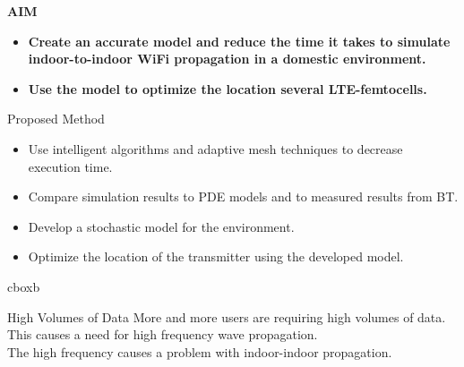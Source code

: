 \documentclass[final]{beamer}
\theoremstyle{plain}
\theoremstyle{definition}
\theoremstyle{remark}
\newlength{\twocolwid}
\begin{document}
\begin{frame}[t]
\begin{columns}[t]
\begin{column}{\twocolwid}
\begin{mdframed}[backgroundcolor=white, userdefinedwidth=0.999999\linewidth]
    \end{mdframed}
    \vspace{1.5cm}
\begin{mdframed}[backgroundcolor=white]
\begin{alertblock}{\textbf{AIM}}

\begin{itemize}

\item \textbf{Create an accurate model and reduce the time it takes to simulate indoor-to-indoor WiFi propagation in a domestic environment.}
\item \textbf{Use the model to optimize the location several LTE-femtocells.
}
\end{itemize}
\end{alertblock}
\vspace{-1cm}
\end{mdframed}
\vspace{2cm}



\begin{block}{Proposed Method}
\vspace{-2cm}
\begin{itemize}
\item Use intelligent algorithms and adaptive mesh techniques to decrease execution time.
\item Compare simulation results to PDE models and to measured results from BT.
\item Develop a stochastic model for the environment.
\item Optimize the location of the transmitter using the developed model.
\end{itemize}
\end{block}
 
 \vspace{-2cm}
 \hspace{0.5in}
 \begin{beamercolorbox}[wd=14in,colsep=0.15cm]{cboxb}
 \end{beamercolorbox}
 
\vspace{1cm}
\begin{alertblock}{High Volumes of Data }
More and more users are requiring high volumes of data. This causes a need for high frequency wave propagation.
\\ 
The high frequency causes a problem with indoor-indoor propagation.
\end{alertblock}


\end{column}
\end{columns}
\end{frame}
\end{document}
